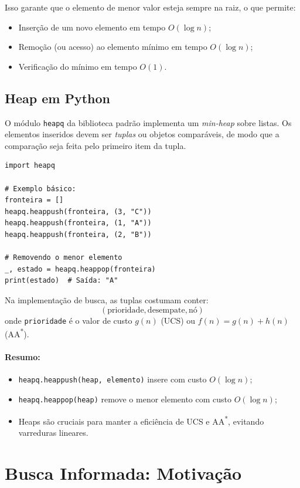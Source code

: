 \documentclass[9pt,a4paper]{extarticle}
\newcommand{\Astar}{A\textsuperscript{*}}
\begin{document}
Isso garante que o elemento de menor valor esteja sempre na raiz, o que permite:
\begin{itemize}
  \item Inserção de um novo elemento em tempo $O(\log n)$;
  \item Remoção (ou acesso) ao elemento mínimo em tempo $O(\log n)$;
  \item Verificação do mínimo em tempo $O(1)$.
\end{itemize}

\subsection*{Heap em Python}

O módulo \texttt{heapq} da biblioteca padrão implementa um \textit{min-heap} sobre listas.
Os elementos inseridos devem ser \emph{tuplas} ou objetos comparáveis,
de modo que a comparação seja feita pelo primeiro item da tupla.

\begin{lstlisting}
import heapq

# Exemplo básico:
fronteira = []
heapq.heappush(fronteira, (3, "C"))
heapq.heappush(fronteira, (1, "A"))
heapq.heappush(fronteira, (2, "B"))

# Removendo o menor elemento
_, estado = heapq.heappop(fronteira)
print(estado)  # Saída: "A"
\end{lstlisting}

Na implementação de busca, as tuplas costumam conter:
\[
(\text{prioridade}, \text{desempate}, \text{nó})
\]
onde \texttt{prioridade} é o valor de custo $g(n)$ (UCS) ou $f(n)=g(n)+h(n)$ (A\Astar).

\paragraph{Resumo:}
\begin{itemize}
  \item \texttt{heapq.heappush(heap, elemento)} insere com custo $O(\log n)$;
  \item \texttt{heapq.heappop(heap)} remove o menor elemento com custo $O(\log n)$;
  \item Heaps são cruciais para manter a eficiência de UCS e A\Astar, evitando varreduras lineares.
\end{itemize}


\section{Busca Informada: Motivação}
\end{document}
